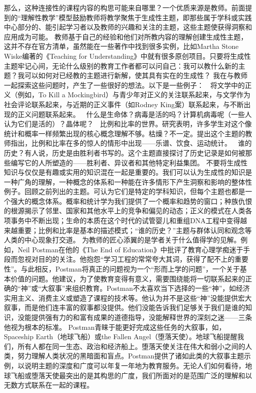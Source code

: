 那么，这种连接性的课程内容的构思可能来自哪里？一个优质来源是教师。前面提到的“理解性教学”模型鼓励教师将教学聚焦于生成性主题，即那些属于学科或实践中心部分的、能引起学习者以及教师的兴趣和关注的主题，这些主题使获得洞察和应用成为可能。
教师基于自己的经验和他们对所教内容的理解创建生成性主题，这并不存在官方清单，虽然能在一些著作中找到很多实例，比如Martha Stone Wiske编著的《Teaching for Understanding》中就有很多原创项目。只要将生成性主题牢记心间，无论什么级别的教育工作者都可以问自己：我可以教什么新的主题？我可以如何对已经教的主题进行新解，使其具有实在的生成性？
我在与教师一起探索这些问题时，产生了一些很好的想法。以下是一些例子：
	将文学中的正义（例如，To Kill a Mockingbird）与青少年对正义的关注联系起来，与文学作为社会评论联系起来，与近期的正义事件（如Rodney King案）联系起来，与不断出现的正义问题联系起来。
	什么是生命体？病毒是活的吗？计算机病毒呢（一些人认为它们是活的）？晶体呢？
	比例和比率的世界。研究表明，许多学生对这个像统计和概率一样频繁出现的核心概念理解不够。枯燥？不一定。提出这个主题的教师指出，比例和比率在多的惊人的情形中出现——乐谱、饮食、运动统计。
	谁的历史？有人说，历史是由胜利者书写的。这个主题直接探讨了历史记录是如何被那些编写它的人所塑造的——胜利者、异议者和其他特定利益集团。
不要将生成性知识与仅仅是有趣或实用的知识混在一起是重要的。我们可以认为生成性的知识是一种广角的理解，一种概念的体系和一种能在许多情形下产生洞察和影响的整体性例子。回顾之前列出的主题。可认为它们是特定的学科知识，但每个主题也都是一个强大的概念体系。概率和统计学为我们提供了一个概率和趋势的窗口；种族仇恨的根源揭示了邻里、国家和其他水平上的竞争和偏见的动态；正义的模式在人类各项事务中不断出现；生命的本质在这个时代的试管婴儿和重组DNA工程中变得越来越重要；比例和比率是基本的描述模式；“谁的历史？”主题与群体认同和观念等人类的中心现象打交道。
为教师的匠心添翼的是学者关于什么值得学的见解。例如，Neil Postman在他的《The End of Education》中批评了教育心理学痴迷于手段而忽视对目的的关注。他抱怨“学习工程的常常夸大其词，获得了配不上的重要性”。与此相反，Postman将真正的问题视为一个“形而上学的问题”，一个关于基本价值的问题。他建议，为了使教育变得有意义，需要围绕能将一切联系起来的正确的“神”或“大叙事”来组织教育。Postman不太喜欢当下选择的一些“神”，如经济实用主义、消费主义或塑造了课程的技术等。他认为并不是这些“神”没能提供宏大叙事，而是他们连丰富的叙事都没提供。他们没能告诉我们足够关于我们是谁的知识，没能提供强有力的和富有成果的道德指导，没能解释世界的深刻之迷——三条他视为根本的标准。
Postman青睐于能更好完成这些任务的大叙事，如，Spaceship Earth（地球飞船）或the Fallen Angel（堕落天使）。地球飞船提醒我们，所有人都在同一生态、政治和经济船上。堕落天使关注在伟大和弱小之间的人类，努力理解人类状况的黑暗面和盲点。Postman提供了诸如此类的大叙事主题示例，以说明主题的深度和广度可以年复一年地为教育服务。无论人们如何看待，地球飞船或堕落天使最突出的是其构思的广度，我们所面对的是范围广泛的理解和以无数方式联系在一起的课程。
